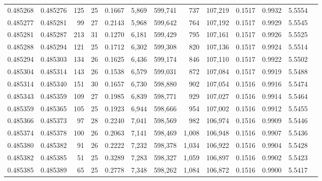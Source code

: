 \begin{tabular}{rrrrrrrrrrrrr}
0.485268 & 0.485276 & 125 &  25 &                                     0.1667 &   5,869 & 599,741 &     737 & 107,219 & 0.1517 & 0.9932 & 5.5554 \\
0.485277 & 0.485281 &  99 &  27 &                                     0.2143 &   5,968 & 599,642 &     764 & 107,192 & 0.1517 & 0.9929 & 5.5545 \\
0.485281 & 0.485287 & 213 &  31 &                                     0.1270 &   6,181 & 599,429 &     795 & 107,161 & 0.1517 & 0.9926 & 5.5525 \\
0.485288 & 0.485294 & 121 &  25 &                                     0.1712 &   6,302 & 599,308 &     820 & 107,136 & 0.1517 & 0.9924 & 5.5514 \\
0.485294 & 0.485303 & 134 &  26 &                                     0.1625 &   6,436 & 599,174 &     846 & 107,110 & 0.1517 & 0.9922 & 5.5502 \\
0.485304 & 0.485314 & 143 &  26 &                                     0.1538 &   6,579 & 599,031 &     872 & 107,084 & 0.1517 & 0.9919 & 5.5488 \\
0.485314 & 0.485340 & 151 &  30 &                                     0.1657 &   6,730 & 598,880 &     902 & 107,054 & 0.1516 & 0.9916 & 5.5474 \\
0.485343 & 0.485359 & 109 &  27 &                                     0.1985 &   6,839 & 598,771 &     929 & 107,027 & 0.1516 & 0.9914 & 5.5464 \\
0.485359 & 0.485365 & 105 &  25 &                                     0.1923 &   6,944 & 598,666 &     954 & 107,002 & 0.1516 & 0.9912 & 5.5455 \\
0.485366 & 0.485373 &  97 &  28 &                                     0.2240 &   7,041 & 598,569 &     982 & 106,974 & 0.1516 & 0.9909 & 5.5446 \\
0.485374 & 0.485378 & 100 &  26 &                                     0.2063 &   7,141 & 598,469 &   1,008 & 106,948 & 0.1516 & 0.9907 & 5.5436 \\
0.485380 & 0.485382 &  91 &  26 &                                     0.2222 &   7,232 & 598,378 &   1,034 & 106,922 & 0.1516 & 0.9904 & 5.5428 \\
0.485382 & 0.485385 &  51 &  25 &                                     0.3289 &   7,283 & 598,327 &   1,059 & 106,897 & 0.1516 & 0.9902 & 5.5423 \\
0.485385 & 0.485389 &  65 &  25 &                                     0.2778 &   7,348 & 598,262 &   1,084 & 106,872 & 0.1516 & 0.9900 & 5.5417 \\

\end{tabular}
